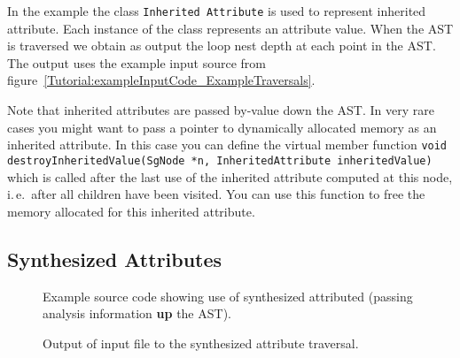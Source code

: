 In the example the class \verb+Inherited Attribute+ is used to represent 
inherited attribute. Each instance of the class represents an attribute 
value. When the AST is traversed we obtain as output the loop nest depth 
at each point in the AST. The output uses the example input source from 
figure~\ref{Tutorial:exampleInputCode_ExampleTraversals}.

Note that inherited attributes are passed by-value down the AST. In very rare
cases you might want to pass a pointer to dynamically allocated memory as an
inherited attribute. In this case you can define the virtual member function
{\tt void destroyInheritedValue(SgNode *n, InheritedAttribute inheritedValue)}
which is called after the last use of the inherited attribute computed at this
node, i.\,e.~after all children have been visited. You can use this function
to free the memory allocated for this inherited attribute.




\clearpage
\subsection{Synthesized Attributes}

\begin{figure}[!h]
{\indent
{\mySmallFontSize


\begin{latexonly}
   
\end{latexonly}

\begin{htmlonly}
   
\end{htmlonly}

}
}
\caption{Example source code showing use of synthesized attributed (passing analysis
         information {\bf up} the AST).}
\label{Tutorial:exampleSynthesizedAttributeTraversal}
\end{figure}

\begin{figure}[!h]
{\indent
{\mySmallFontSize


\begin{latexonly}
   
\end{latexonly}

\begin{htmlonly}
   
\end{htmlonly}

}
}
\caption{Output of input file to the synthesized attribute traversal.}
\label{Tutorial:exampleOutput_SynthesizedAttributeTraversal}
\end{figure}

